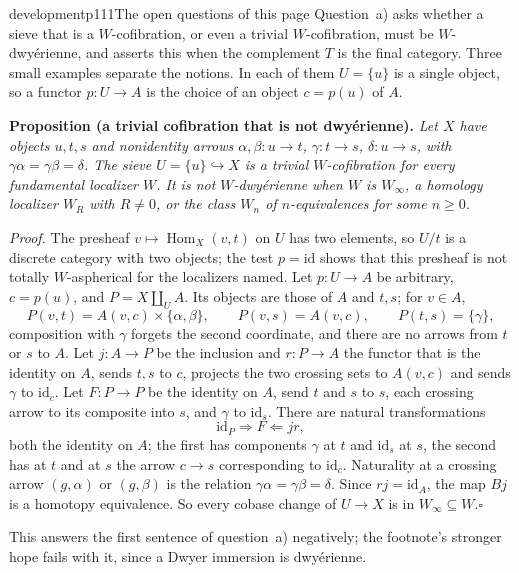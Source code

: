 \begin{dcomment}{development}{p111}{The open questions of this page}
Question~a) asks whether a sieve that is a $W$-cofibration, or even a trivial $W$-cofibration, must be $W$-dwy\'erienne, and asserts this when the complement $T$ is the final category. Three small examples separate the notions. In each of them $U=\{u\}$ is a single object, so a functor $p:U\to A$ is the choice of an object $c=p(u)$ of $A$.

\textbf{Proposition (a trivial cofibration that is not dwy\'erienne).}\ours
\textit{Let $X$ have objects $u,t,s$ and nonidentity arrows $\alpha,\beta:u\to t$, $\gamma:t\to s$, $\delta:u\to s$, with $\gamma\alpha=\gamma\beta=\delta$. The sieve $U=\{u\}\hookrightarrow X$ is a trivial $W$-cofibration for every fundamental localizer $W$. It is not $W$-dwy\'erienne when $W$ is $W_\infty$, a homology localizer $W_R$ with $R\neq0$, or the class $W_n$ of $n$-equivalences for some $n\geq0$.}

\textit{Proof.}
The presheaf $v\mapsto\operatorname{Hom}_X(v,t)$ on $U$ has two elements, so $U/t$ is a discrete category with two objects; the test $p=\mathrm{id}$ shows that this presheaf is not totally $W$-aspherical for the localizers named. Let $p:U\to A$ be arbitrary, $c=p(u)$, and $P=X\amalg_UA$. Its objects are those of $A$ and $t,s$; for $v\in A$,
\[
 P(v,t)=A(v,c)\times\{\alpha,\beta\},\qquad P(v,s)=A(v,c),\qquad P(t,s)=\{\gamma\},
\]
composition with $\gamma$ forgets the second coordinate, and there are no arrows from $t$ or $s$ to $A$. Let $j:A\to P$ be the inclusion and $r:P\to A$ the functor that is the identity on $A$, sends $t,s$ to $c$, projects the two crossing sets to $A(v,c)$ and sends $\gamma$ to $\mathrm{id}_c$. Let $F:P\to P$ be the identity on $A$, send $t$ and $s$ to $s$, each crossing arrow to its composite into $s$, and $\gamma$ to $\mathrm{id}_s$. There are natural transformations
\[
 \mathrm{id}_P\Longrightarrow F\Longleftarrow jr,
\]
both the identity on $A$; the first has components $\gamma$ at $t$ and $\mathrm{id}_s$ at $s$, the second has at $t$ and at $s$ the arrow $c\to s$ corresponding to $\mathrm{id}_c$. Naturality at a crossing arrow $(g,\alpha)$ or $(g,\beta)$ is the relation $\gamma\alpha=\gamma\beta=\delta$. Since $rj=\mathrm{id}_A$, the map $Bj$ is a homotopy equivalence. So every cobase change of $U\to X$ is in $W_\infty\subseteq W$.\hfill$\square$

This answers the first sentence of question~a) negatively; the footnote's stronger hope fails with it, since a Dwyer immersion is dwy\'erienne.


\end{dcomment}
